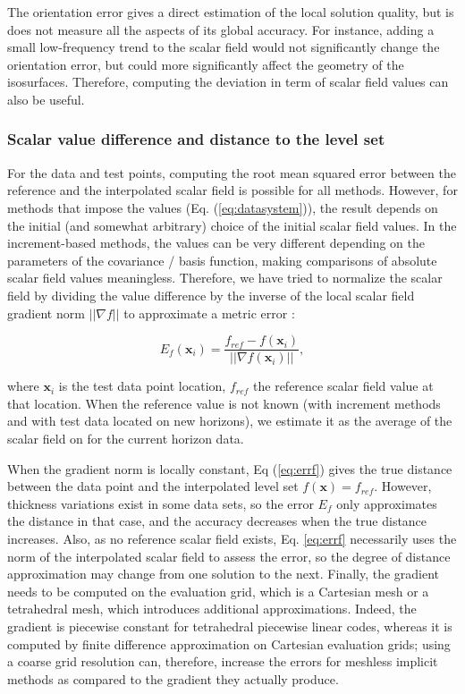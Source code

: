 \documentclass[preprint]{ring20}
\newcommand{\bx}{\mathbf{x}}
\begin{document}
The orientation error gives a direct estimation of the local solution quality, but is does not measure all the aspects of its global accuracy. For instance, adding a small low-frequency trend to the scalar field would not significantly change the orientation error, but could more significantly affect the geometry of the isosurfaces. Therefore, computing the deviation in term of scalar field values can also be useful. 

\subsubsection{Scalar value difference and distance to the level set}

For the data and test points, computing the root mean squared error between the reference and the interpolated scalar field is possible for all methods. However, for methods that impose the values (Eq. (\ref{eq:datasystem})), the result depends on the initial (and somewhat arbitrary) choice of the initial scalar field values. In the increment-based methods, the values can be very different depending on the parameters of the covariance / basis function, making comparisons of absolute scalar field values meaningless. Therefore, we have tried to normalize the scalar field by dividing the value difference by the inverse of the local scalar field gradient norm $||\nabla f||$ to approximate a metric error \citep{Caumon2010MG}: 

\begin{equation}
\label{eq:errf}
E_f(\bx_i) = \frac{f_{ref} - f(\bx_i)}{||\nabla f(\bx_i)||},
\end{equation}

\noindent where $\bx_i$ is the test data point location, $f_{ref}$ the reference scalar field value at that location. When the reference value is not known (with increment methods and with test data located on new horizons), we estimate it as the average of the scalar field on for the current horizon data. 

When the gradient norm is locally constant, Eq (\ref{eq:errf}) gives the true distance between the data point and the interpolated level set $f(\bx) = f_{ref}$. However, thickness variations exist in some data sets, so the error $E_f$ only approximates the distance in that case, and the accuracy decreases when the true distance increases. Also, as no reference scalar field exists, Eq. \ref{eq:errf} necessarily uses the norm of the interpolated scalar field to assess the error, so the degree of distance approximation may change from one solution to the next. Finally, the gradient needs to be computed on the evaluation grid, which is a Cartesian mesh or a tetrahedral mesh, which introduces additional approximations. Indeed, the gradient is piecewise constant for tetrahedral piecewise linear codes, whereas it is computed by finite difference approximation on Cartesian evaluation grids; using a coarse grid resolution can, therefore, increase the errors for meshless implicit methods as compared to the gradient they actually produce.  
\end{document}
